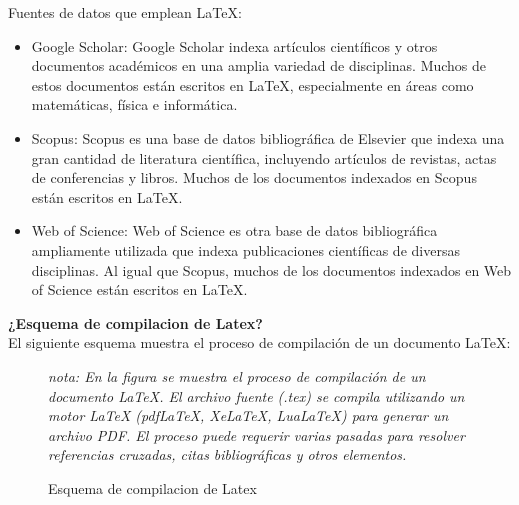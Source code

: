 \documentclass[10pt]{article}
\begin{document}
Fuentes de datos que emplean LaTeX:
\begin{itemize}
	\item Google Scholar: Google Scholar indexa artículos científicos y otros documentos académicos en una amplia variedad de disciplinas. Muchos de estos documentos están escritos en LaTeX, especialmente en áreas como matemáticas, física e informática.
	\item Scopus: Scopus es una base de datos bibliográfica de Elsevier que indexa una gran cantidad de literatura científica, incluyendo artículos de revistas, actas de conferencias y libros. Muchos de los documentos indexados en Scopus están escritos en LaTeX.
	\item Web of Science: Web of Science es otra base de datos bibliográfica ampliamente utilizada que indexa publicaciones científicas de diversas disciplinas. Al igual que Scopus, muchos de los documentos indexados en Web of Science están escritos en LaTeX.
\end{itemize}

\textbf{¿Esquema de compilacion de Latex?}\\
El siguiente esquema muestra el proceso de compilación de un documento LaTeX:
\begin{figure}[ht]
    \centering
    \caption{Esquema de compilacion de Latex}
    \label{fig:LatexD}
\textit{nota: En la figura se muestra el proceso de compilación de un documento LaTeX. El archivo fuente (.tex) se compila utilizando un motor LaTeX (pdfLaTeX, XeLaTeX, LuaLaTeX) para generar un archivo PDF. El proceso puede requerir varias pasadas para resolver referencias cruzadas, citas bibliográficas y otros elementos.}
\end{figure}

\newpage %
\vspace{0.5cm}
\end{document}

